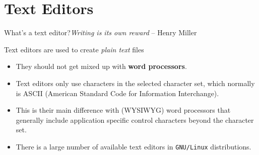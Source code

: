 \section{Text Editors}
\begin{frame}{What's a text editor?}{\emph{Writing is its own reward} -- Henry Miller}
  
  \begin{block}{ \alert{Text editors} are used to create \emph{plain text} files}
    
    {\small
      \begin{itemize}
      \item They should not get mixed up with \alert{\textbf{word processors}}.
      \item Text editors only use characters in the selected character set, which normally is ASCII (American Standard Code for Information Interchange). 
      \item This is their main difference with (WYSIWYG) word processors that   generally include application specific control characters beyond the character set. 
      \item There is a large number of available text editors in \texttt{GNU/Linux} distributions.
      \end{itemize}
      }
  \end{block}
  
\end{frame}
